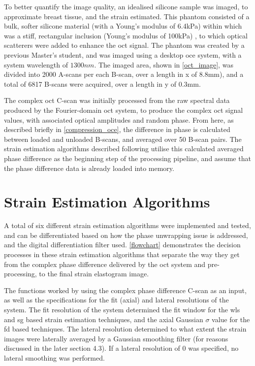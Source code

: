 To better quantify the image quality, an idealised silicone sample was imaged, to approximate breast tissue, and the strain estimated. This phantom consisted of a bulk, softer silicone material (with a Young's modulus of 6.4kPa) within which was a stiff, rectangular inclusion (Young's modulus of 100kPa) \cite{hepburn_improving_2017}, to which optical scatterers were added to enhance the \ac{oct} signal. The phantom was created by a previous Master's student, and was imaged using a desktop \ac{oce} system, with a system wavelength of $1300nm$. The imaged area, shown in \autoref{oct_image}, was divided into 2000 A-scans per each B-scan, over a length in x of 8.8mm), and a total of 6817 B-scans were acquired, over a length in y of 0.3mm.

The complex \ac{oct} C-scan was initially processed from the raw spectral data produced by the Fourier-domain \ac{oct} system, to produce the complex \ac{oct} signal values, with associated optical amplitudes and random phase. From here, as described briefly in \autoref{compression_oce}, the difference in phase is calculated between loaded and unloaded B-scans, and averaged over 50 B-scan pairs. The strain estimation algorithms described following utilise this calculated averaged phase difference as the beginning step of the processing pipeline, and assume that the phase difference data is already loaded into memory.

\section{Strain Estimation Algorithms}\label{algorithms}

A total of six different strain estimation algorithms were implemented and tested, and can be differentiated based on how the phase unwrapping issue is addressed, and the digital differentiation filter used. \autoref{flowchart} demonstrates the decision processes in these strain estimation algorithms that separate the way they get from the complex phase difference delivered by the \ac{oct} system and pre-processing, to the final strain elastogram image.

The functions worked by using the complex phase difference C-scan as an input, as well as the specifications for the fit (axial) and lateral resolutions of the system. The fit resolution of the system determined the fit window for the \ac{wls} and \ac{sg} based strain estimation techniques, and the axial Gaussian $\sigma$ value for the \ac{fd} based techniques. The lateral resolution determined to what extent the strain images were laterally averaged by a Gaussian smoothing filter (for reasons discussed in the later section 4.3). If a lateral resolution of 0 was specified, no lateral smoothing was performed. 

